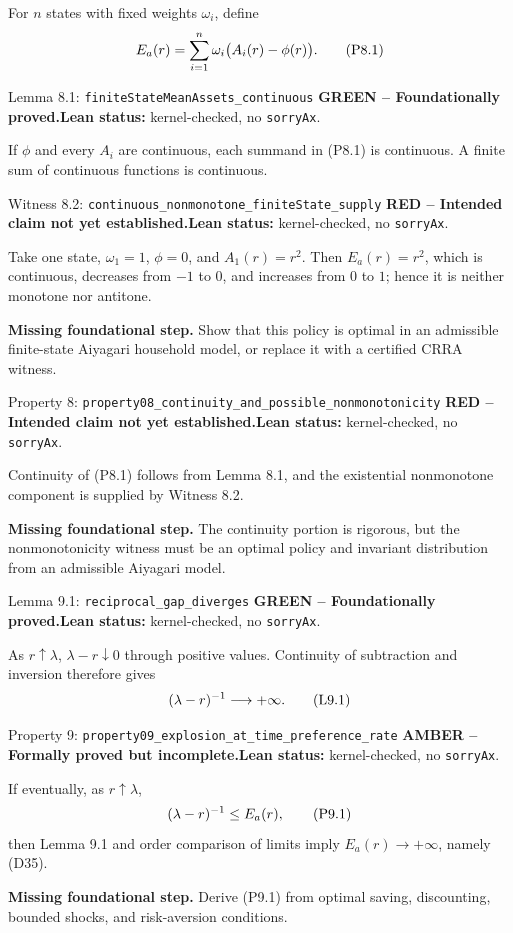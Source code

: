 \documentclass[11pt]{article}
\newcommand{\leanname}[1]{\nolinkurl{#1}}
\newcommand{\eqP}[1]{\refstepcounter{equation}\tag{P#1}}
\newcommand{\eqL}[1]{\refstepcounter{equation}\tag{L#1}}
\newcommand{\formalcheck}{\textbf{Lean status:} kernel-checked, no \texttt{sorryAx}.}
\newcommand{\missing}[1]{\par\smallskip\textbf{Missing foundational step.} #1}
\newcommand{\greenstatus}{\textcolor{proved}{\textbf{GREEN -- Foundationally proved.}}}
\newcommand{\amberstatus}{\textcolor{conditional}{\textbf{AMBER -- Formally proved but incomplete.}}}
\newcommand{\redstatus}{\textcolor{incomplete}{\textbf{RED -- Intended claim not yet established.}}}
\begin{document}
For \(n\) states with fixed weights \(\omega_i\), define
\begin{equation}
 E_a(r)=\sum_{i=1}^n\omega_i\bigl(A_i(r)-\phi(r)\bigr). \eqP{8.1}\label{P8.1}
\end{equation}

\begin{greenbox}{Lemma 8.1: \leanname{finiteStateMeanAssets_continuous}}
\greenstatus\quad\formalcheck

If \(\phi\) and every \(A_i\) are continuous, each summand in (P8.1) is
continuous.  A finite sum of continuous functions is continuous.
\end{greenbox}

\begin{redbox}{Witness 8.2: \leanname{continuous_nonmonotone_finiteState_supply}}
\redstatus\quad\formalcheck

Take one state, \(\omega_1=1\), \(\phi=0\), and \(A_1(r)=r^2\).  Then
\(E_a(r)=r^2\), which is continuous, decreases from \(-1\) to \(0\), and
increases from \(0\) to \(1\); hence it is neither monotone nor antitone.

\missing{Show that this policy is optimal in an admissible finite-state
Aiyagari household model, or replace it with a certified CRRA witness.}
\end{redbox}

\begin{redbox}{Property 8: \leanname{property08_continuity_and_possible_nonmonotonicity}}
\redstatus\quad\formalcheck

Continuity of (P8.1) follows from Lemma 8.1, and the existential nonmonotone
component is supplied by Witness 8.2.

\missing{The continuity portion is rigorous, but the nonmonotonicity witness
must be an optimal policy and invariant distribution from an admissible
Aiyagari model.}
\end{redbox}

\begin{greenbox}{Lemma 9.1: \leanname{reciprocal_gap_diverges}}
\greenstatus\quad\formalcheck

As \(r\uparrow\lambda\), \(\lambda-r\downarrow0\) through positive values.
Continuity of subtraction and inversion therefore gives
\begin{equation}
 (\lambda-r)^{-1}\longrightarrow+\infty. \eqL{9.1}\label{L9.1}
\end{equation}
\end{greenbox}

\begin{amberbox}{Property 9: \leanname{property09_explosion_at_time_preference_rate}}
\amberstatus\quad\formalcheck

If eventually, as \(r\uparrow\lambda\),
\begin{equation}
 (\lambda-r)^{-1}\le E_a(r), \eqP{9.1}\label{P9.1}
\end{equation}
then Lemma 9.1 and order comparison of limits imply
\(E_a(r)\to+\infty\), namely (D35).

\missing{Derive (P9.1) from optimal saving, discounting, bounded shocks, and
risk-aversion conditions.}
\end{amberbox}
\end{document}
